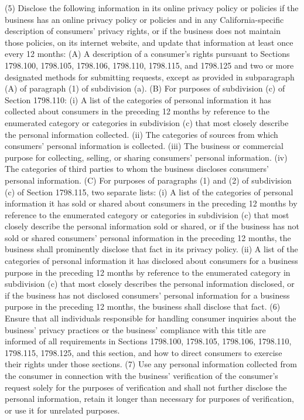 (5) Disclose the following information in its online privacy policy or policies if the business has an online privacy policy or policies and in any California-specific description of consumers’ privacy rights, or if the business does not maintain those policies, on its internet website, and update that information at least once every 12 months:
(A) A description of a consumer’s rights pursuant to Sections 1798.100, 1798.105, 1798.106, 1798.110, 1798.115, and 1798.125 and two or more designated methods for submitting requests, except as provided in subparagraph (A) of paragraph (1) of subdivision (a).
(B) For purposes of subdivision (c) of Section 1798.110:
(i) A list of the categories of personal information it has collected about consumers in the preceding 12 months by reference to the enumerated category or categories in subdivision (c) that most closely describe the personal information collected.
(ii) The categories of sources from which consumers’ personal information is collected.
(iii) The business or commercial purpose for collecting, selling, or sharing consumers’ personal information.
(iv) The categories of third parties to whom the business discloses consumers’ personal information.
(C) For purposes of paragraphs (1) and (2) of subdivision (c) of Section 1798.115, two separate lists:
(i) A list of the categories of personal information it has sold or shared about consumers in the preceding 12 months by reference to the enumerated category or categories in subdivision (c) that most closely describe the personal information sold or shared, or if the business has not sold or shared consumers’ personal information in the preceding 12 months, the business shall prominently disclose that fact in its privacy policy.
(ii) A list of the categories of personal information it has disclosed about consumers for a business purpose in the preceding 12 months by reference to the enumerated category in subdivision (c) that most closely describes the personal information disclosed, or if the business has not disclosed consumers’ personal information for a business purpose in the preceding 12 months, the business shall disclose that fact.
(6) Ensure that all individuals responsible for handling consumer inquiries about the business’ privacy practices or the business’ compliance with this title are informed of all requirements in Sections 1798.100, 1798.105, 1798.106, 1798.110, 1798.115, 1798.125, and this section, and how to direct consumers to exercise their rights under those sections.
(7) Use any personal information collected from the consumer in connection with the business’ verification of the consumer’s request solely for the purposes of verification and shall not further disclose the personal information, retain it longer than necessary for purposes of verification, or use it for unrelated purposes.
